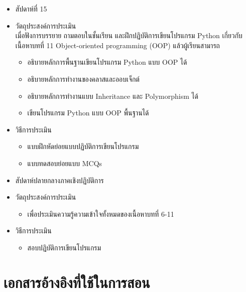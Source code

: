 \begin{tcolorbox}[breakable,enhanced,fonttitle=\bfseries]
\begin{itemize}
\item สัปดาห์ที่ 15
\item วัตถุประสงค์การประเมิน
	\\ เมื่อฟังการบรรยาย ถามตอบในชั้นเรียน และฝึกปฏิบัติการเขียนโปรแกรม Python เกี่ยวกับเนื้อหาบทที่ 11 Object-oriented programming (OOP) แล้วผู้เรียนสามารถ
	\begin{itemize}
	\item อธิบายหลักการพื้นฐานเขียนโปรแกรม Python แบบ OOP ได้
	\item อธิบายหลักการทำงานของคลาสและออบเจ็กต์
	\item อธิบายหลักการทำงานแบบ Inheritance และ Polymorphism ได้
	\item เขียนโปรแกรม Python แบบ OOP พื้นฐานได้
	\end{itemize}
\item วิธีการประเมิน
	\begin{itemize}
	\item แบบฝึกหัดย่อยแบบปฏิบัติการเขียนโปรแกรม
	\item แบบทดสอบย่อยแบบ MCQs
	\end{itemize}
\end{itemize}
\end{tcolorbox}
\vspace{1.5cm}

\begin{tcolorbox}[breakable,enhanced,fonttitle=\bfseries]
\begin{itemize}
\item สัปดาห์ปลายกลางภาคเชิงปฏิบัติการ
\item วัตถุประสงค์การประเมิน
	\begin{itemize}
	\item เพื่อประเมินความรู้ความเข้าใจทั้งหมดของเนื้อหาบทที่ 6-11
	\end{itemize}
\item วิธีการประเมิน
	\begin{itemize}
	\item สอบปฏิบัติการเขียนโปรแกรม
	\end{itemize}
\end{itemize}
\end{tcolorbox}
\vspace{1.5cm}

\section*{เอกสารอ้างอิงที่ใช้ในการสอน}

